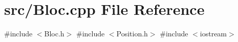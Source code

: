 \section{src/\+Bloc.cpp File Reference}
\label{_bloc_8cpp}
{\ttfamily \#include $<$Bloc.\+h$>$}\newline
{\ttfamily \#include $<$Position.\+h$>$}\newline
{\ttfamily \#include $<$iostream$>$}\newline
